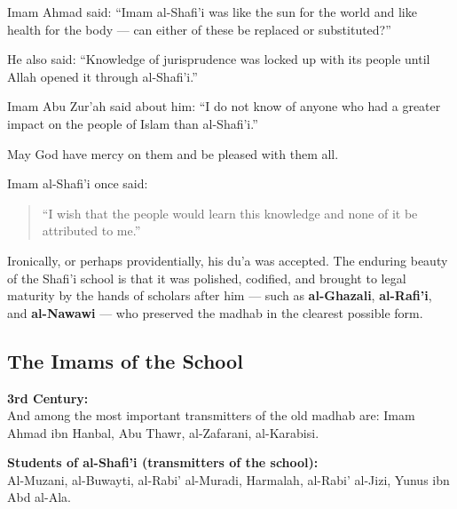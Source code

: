 \documentclass[
  a4paper,
  DIV=11,
  numbers=noendperiod]{scrartcl}
\begin{document}
Imam Ahmad said: ``Imam al-Shafi'i was like the sun for the world and
like health for the body --- can either of these be replaced or
substituted?''

He also said: ``Knowledge of jurisprudence was locked up with its people
until Allah opened it through al-Shafi'i.''

Imam Abu Zur'ah said about him: ``I do not know of anyone who had a
greater impact on the people of Islam than al-Shafi'i.''

May God have mercy on them and be pleased with them all.

\begin{tcolorbox}[enhanced jigsaw, colframe=quarto-callout-note-color-frame, breakable, toptitle=1mm, coltitle=black, opacityback=0, bottomrule=.15mm, left=2mm, bottomtitle=1mm, title=\textcolor{quarto-callout-note-color}{\faInfo}\hspace{0.5em}{The Humility of the Imam and the Wisdom of His Legacy}, rightrule=.15mm, opacitybacktitle=0.6, colback=white, colbacktitle=quarto-callout-note-color!10!white, arc=.35mm, toprule=.15mm, titlerule=0mm, leftrule=.75mm]

Imam al-Shafi'i once said:

\begin{quote}
``I wish that the people would learn this knowledge and none of it be
attributed to me.''
\end{quote}

Ironically, or perhaps providentially, his du'a was accepted. The
enduring beauty of the Shafi'i school is that it was polished, codified,
and brought to legal maturity by the hands of scholars after him ---
such as \textbf{al-Ghazali}, \textbf{al-Rafi'i}, and \textbf{al-Nawawi}
--- who preserved the madhab in the clearest possible form.

\end{tcolorbox}

\subsection{The Imams of the School}\label{the-imams-of-the-school}

\textbf{3rd Century:}\\
And among the most important transmitters of the old madhab are: Imam
Ahmad ibn Hanbal, Abu Thawr, al-Zafarani, al-Karabisi.

\textbf{Students of al-Shafi'i (transmitters of the school):}\\
Al-Muzani, al-Buwayti, al-Rabi' al-Muradi, Harmalah, al-Rabi' al-Jizi,
Yunus ibn Abd al-Ala.
\end{document}
